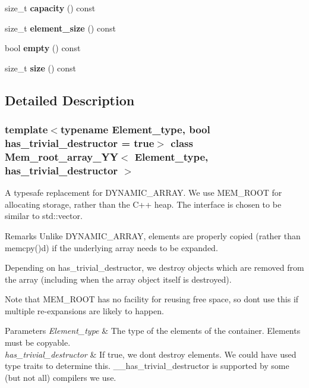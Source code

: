 \begin{DoxyCompactItemize}
size\+\_\+t {\bfseries capacity} () const
\item 
\mbox{\label{classMem__root__array__YY_a56d5c552ddc158f1fbcef0cedccbbd8a}} 
size\+\_\+t {\bfseries element\+\_\+size} () const
\item 
\mbox{\label{classMem__root__array__YY_a378ef1a93daff80be898717ddfc08c56}} 
bool {\bfseries empty} () const
\item 
\mbox{\label{classMem__root__array__YY_ac8db98f9eb5dfea2099ce6734bdb997f}} 
size\+\_\+t {\bfseries size} () const
\end{DoxyCompactItemize}


\subsection{Detailed Description}
\subsubsection*{template$<$typename Element\+\_\+type, bool has\+\_\+trivial\+\_\+destructor = true$>$\newline
class Mem\+\_\+root\+\_\+array\+\_\+\+Y\+Y$<$ Element\+\_\+type, has\+\_\+trivial\+\_\+destructor $>$}

A typesafe replacement for D\+Y\+N\+A\+M\+I\+C\+\_\+\+A\+R\+R\+AY. We use M\+E\+M\+\_\+\+R\+O\+OT for allocating storage, rather than the C++ heap. The interface is chosen to be similar to std\+::vector.

\begin{DoxyRemark}{Remarks}
Unlike D\+Y\+N\+A\+M\+I\+C\+\_\+\+A\+R\+R\+AY, elements are properly copied (rather than memcpy()d) if the underlying array needs to be expanded.

Depending on has\+\_\+trivial\+\_\+destructor, we destroy objects which are removed from the array (including when the array object itself is destroyed).

Note that M\+E\+M\+\_\+\+R\+O\+OT has no facility for reusing free space, so don\textquotesingle{}t use this if multiple re-\/expansions are likely to happen.
\end{DoxyRemark}

\begin{DoxyParams}{Parameters}
{\em Element\+\_\+type} & The type of the elements of the container. Elements must be copyable. \\
\hline
{\em has\+\_\+trivial\+\_\+destructor} & If true, we don\textquotesingle{}t destroy elements. We could have used type traits to determine this. \+\_\+\+\_\+has\+\_\+trivial\+\_\+destructor is supported by some (but not all) compilers we use. \\
\hline
\end{DoxyParams}


